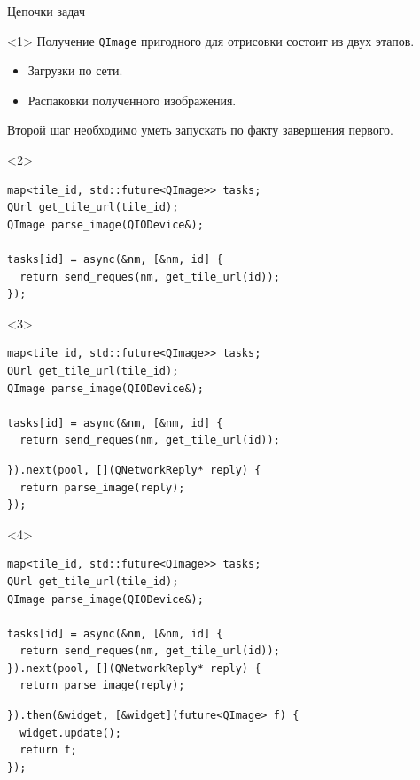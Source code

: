 \documentclass[aspectratio=169,hyperref={unicode},17pt]{beamer}
\begin{document}
\begin{frame}[fragile,t]{Цепочки задач}
\begin{onlyenv}<1>
Получение \texttt{QImage} пригодного для отрисовки состоит из двух этапов.
\begin{itemize}
 \item Загрузки по сети.
 \item Распаковки полученного изображения.
\end{itemize}
Второй шаг необходимо уметь запускать по факту завершения первого.
\end{onlyenv}
\begin{onlyenv}<2>
\begin{lstlisting}[style=cppcode,belowskip=0pt]
map<tile_id, std::future<QImage>> tasks;
QUrl get_tile_url(tile_id);
QImage parse_image(QIODevice&);

tasks[id] = async(&nm, [&nm, id] {
  return send_reques(nm, get_tile_url(id));
});
\end{lstlisting}
\end{onlyenv}
\begin{onlyenv}<3>
\begin{lstlisting}[style=cppcode,belowskip=0pt]
map<tile_id, std::future<QImage>> tasks;
QUrl get_tile_url(tile_id);
QImage parse_image(QIODevice&);

tasks[id] = async(&nm, [&nm, id] {
  return send_reques(nm, get_tile_url(id));
\end{lstlisting}
\begin{lstlisting}[style=cppcode,backgroundcolor=\color{gray!30},aboveskip=0pt,belowskip=0pt]
}).next(pool, [](QNetworkReply* reply) {
  return parse_image(reply);
});
\end{lstlisting}
\end{onlyenv}
\begin{onlyenv}<4>
\begin{lstlisting}[style=cppcode,belowskip=0pt]
map<tile_id, std::future<QImage>> tasks;
QUrl get_tile_url(tile_id);
QImage parse_image(QIODevice&);

tasks[id] = async(&nm, [&nm, id] {
  return send_reques(nm, get_tile_url(id));
}).next(pool, [](QNetworkReply* reply) {
  return parse_image(reply);
\end{lstlisting}
\begin{lstlisting}[style=cppcode,backgroundcolor=\color{gray!30},aboveskip=0pt,belowskip=0pt]
}).then(&widget, [&widget](future<QImage> f) {
  widget.update();
  return f;
});
\end{lstlisting}
\end{onlyenv}
\end{frame}
\end{document}
